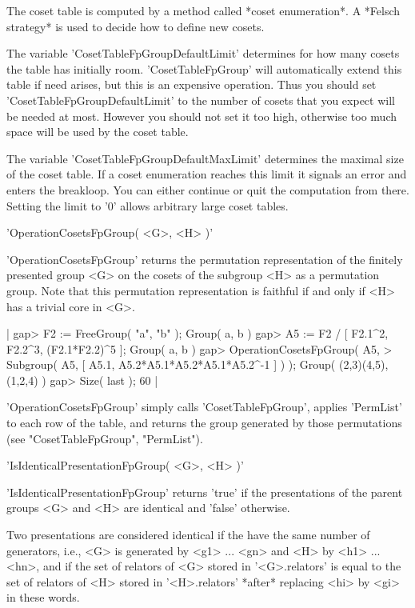 The coset  table is  computed by a method called *coset enumeration*.   A
*Felsch strategy* is used to decide how to define new cosets.

The  variable  'CosetTableFpGroupDefaultLimit'  determines  for  how many
cosets   the  table  has   initially   room.   'CosetTableFpGroup'   will
automatically  extend this table if need arises, but this is an expensive
operation.  Thus  you  should  set 'CosetTableFpGroupDefaultLimit' to the
number of cosets that  you expect will be  needed at most.   However  you
should not set it too  high, otherwise too much space will be used by the
coset table.

The  variable  'CosetTableFpGroupDefaultMaxLimit' determines the  maximal
size of  the coset  table.  If a coset enumeration reaches  this limit it
signals an error  and enters the breakloop.  You  can  either continue or
quit  the computation  from  there.   Setting  the  limit to  '0'  allows
arbitrary large coset tables.


'OperationCosetsFpGroup( <G>, <H> )'

'OperationCosetsFpGroup'  returns the  permutation  representation of the
finitely  presented group <G>  on  the  cosets of  the subgroup  <H> as a
permutation group.  Note that this permutation representation is faithful
if and only if <H> has a trivial core in <G>.

|    gap> F2 := FreeGroup( "a", "b" );
    Group( a, b )
    gap> A5 := F2 / [ F2.1^2, F2.2^3, (F2.1*F2.2)^5 ];
    Group( a, b )
    gap> OperationCosetsFpGroup( A5,
    >            Subgroup( A5, [ A5.1, A5.2*A5.1*A5.2*A5.1*A5.2^-1 ] ) );
    Group( (2,3)(4,5), (1,2,4) )
    gap> Size( last );
    60 |

'OperationCosetsFpGroup'   simply  calls   'CosetTableFpGroup',   applies
'PermList' to each  row  of the table, and returns the group generated by
those permutations (see "CosetTableFpGroup", "PermList").


'IsIdenticalPresentationFpGroup( <G>, <H> )'

'IsIdenticalPresentationFpGroup'  returns 'true'  if the presentations of
the parent groups <G> and <H> are identical and 'false' otherwise.

Two presentations are considered identical if the have the same number of
generators,  i.e.,  <G> is generated by <g1> ... <gn> and <H> by <h1> ...
<hn>, and if the set of relators of <G> stored in '<G>.relators' is equal
to the set of relators of <H> stored in '<H>.relators' *after*  replacing
<hi> by <gi> in these words.

